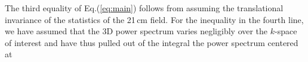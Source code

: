 \documentclass[twocolumn,apj,numberedappendix]{emulateapj}
\renewcommand\[{\begin{equation}}
\renewcommand\]{\end{equation}}
\begin{document}
%
%
The third equality of Eq.(\ref{eq:main}) follows from assuming the translational invariance of the statistics of the 21\,cm field. 
For the inequality in the fourth line, we have assumed that the  3D power spectrum varies negligibly over the $k$-space of interest and have thus pulled out of the integral the power spectrum centered at 
\end{document}
